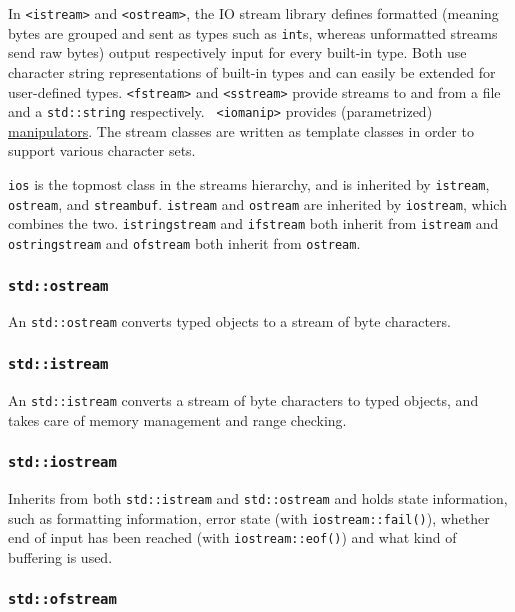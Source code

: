 \documentclass[8pt, table, xcdraw]{article}%
\begin{document}
In \lstinline{<istream>} and \lstinline{<ostream>}, the IO stream library defines formatted (meaning bytes are grouped and sent as types such as \lstinline{int}s, whereas unformatted streams send raw bytes) output respectively input for every built-in type. Both use character string representations of built-in types and can easily be extended for user-defined types. \lstinline{<fstream>} and \lstinline{<sstream>} provide streams to and from a file and a \lstinline{std::string} respectively. \lstinline{ <iomanip>} provides (parametrized) \hyperref[manipulators]{manipulators}. The stream classes are written as template classes in order to support various character sets.

\lstinline{ios} is the topmost class in the streams hierarchy, and is inherited by \lstinline{istream}, \lstinline{ostream}, and \lstinline{streambuf}. \lstinline{istream} and \lstinline{ostream} are inherited by \lstinline{iostream}, which combines the two. \lstinline{istringstream} and \lstinline{ifstream} both inherit from \lstinline{istream} and \lstinline{ostringstream} and \lstinline{ofstream} both inherit from \lstinline{ostream}.

\subsubsection{\lstinline{std::ostream}}

An \lstinline{std::ostream} converts typed objects to a stream of byte characters.

\subsubsection{\lstinline{std::istream}}

An \lstinline{std::istream} converts a stream of byte characters to typed objects, and takes care of memory management and range checking.

\subsubsection{\lstinline{std::iostream}}

Inherits from both \lstinline{std::istream} and \lstinline{std::ostream} and holds state information, such as formatting information, error state (with \lstinline{iostream::fail()}), whether end of input has been reached (with \lstinline{iostream::eof()}) and what kind of buffering is used.

\subsubsection{\lstinline{std::ofstream}}
\end{document}
